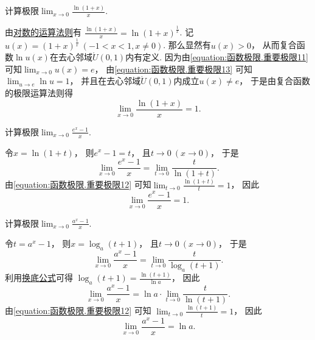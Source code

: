 \begin{example}
计算极限\(\lim_{x\to0} \frac{\ln(1+x)}{x}\).
\begin{solution}
由\hyperref[equation:函数.对数的基本运算法则3]{对数的运算法则}有
\(\frac{\ln(1+x)}{x} = \ln(1+x)^{\frac1x}\).
记\(u(x) = (1+x)^{\frac1x}\ (-1<x<1,x\neq0)\).
那么显然有\(u(x)>0\)，
从而复合函数\(\ln u(x)\)在去心邻域\(\mathring{U}(0,1)\)内有定义.
因为由\cref{equation:函数极限.重要极限11} 可知\(\lim_{x\to0} u(x) = e\)，
由\cref{equation:函数极限.重要极限13} 可知\(\lim_{u\to e} \ln u = 1\)，
并且在去心邻域\(\mathring{U}(0,1)\)内成立\(u(x)\neq e\)，
于是由复合函数的极限运算法则得\begin{equation}\label{equation:函数极限.重要极限12}
	\lim_{x\to0} \frac{\ln(1+x)}{x} = 1.
\end{equation}
\end{solution}
\end{example}

\begin{example}
计算极限\(\lim_{x\to0} \frac{e^x-1}{x}\).
\begin{solution}
令\(x=\ln(1+t)\)，
则\(e^x-1=t\)，
且\(t\to0\ (x\to0)\)，
于是\[
	\lim_{x\to0} \frac{e^x-1}{x}
	= \lim_{t\to0} \frac{t}{\ln(1+t)}.
\]
由\cref{equation:函数极限.重要极限12} 可知\(\lim_{t\to0} \frac{\ln(1+t)}{t} = 1\)，
因此\begin{equation}\label{equation:函数极限.重要极限14}
	\lim_{x\to0} \frac{e^x-1}{x} = 1.
\end{equation}
\end{solution}
\end{example}

\begin{example}
计算极限\(\lim_{x\to0} \frac{a^x-1}{x}\).
\begin{solution}
令\(t=a^x-1\)，
则\(x=\log_a(t+1)\)，
且\(t\to0\ (x\to0)\)，
于是\[
	\lim_{x\to0} \frac{a^x-1}{x}
	= \lim_{t\to0} \frac{t}{\log_a(t+1)}.
\]
利用\hyperref[equation:函数.换底公式]{换底公式}可得
\(\log_a(t+1) = \frac{\ln(t+1)}{\ln a}\)，
因此\[
	\lim_{x\to0} \frac{a^x-1}{x}
	= \ln a \cdot \lim_{t\to0} \frac{t}{\ln(t+1)}.
\]
由\cref{equation:函数极限.重要极限12} 可知
\(\lim_{t\to0} \frac{\ln(t+1)}{t} = 1\)，
因此\begin{equation}\label{equation:函数极限.重要极限17}
	\lim_{x\to0} \frac{a^x-1}{x} = \ln a.
\end{equation}
\end{solution}
\end{example}

